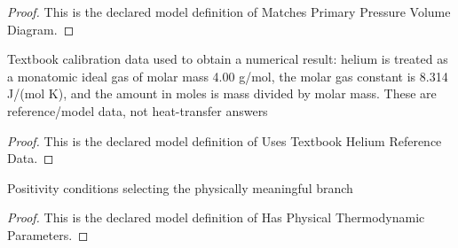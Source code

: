 \begin{proof}
  This is the declared model definition of Matches Primary Pressure Volume Diagram.
\end{proof}
\begin{definition}
  \label{def:physics:phyx-mini-0414:phyxminiproblems-problemphyxmini0414-usestextbookheliumreferencedata}
  Textbook calibration data used to obtain a numerical result: helium is treated as a monatomic ideal gas of molar mass 4.00 g/mol, the molar gas constant is 8.314 J/(mol K), and the amount in moles is mass divided by molar mass. These are reference/model data, not heat-transfer answers
\end{definition}
\begin{proof}
  This is the declared model definition of Uses Textbook Helium Reference Data.
\end{proof}
\begin{definition}
  \label{def:physics:phyx-mini-0414:phyxminiproblems-problemphyxmini0414-hasphysicalthermodynamicparameters}
  Positivity conditions selecting the physically meaningful branch
\end{definition}
\begin{proof}
  This is the declared model definition of Has Physical Thermodynamic Parameters.
\end{proof}

